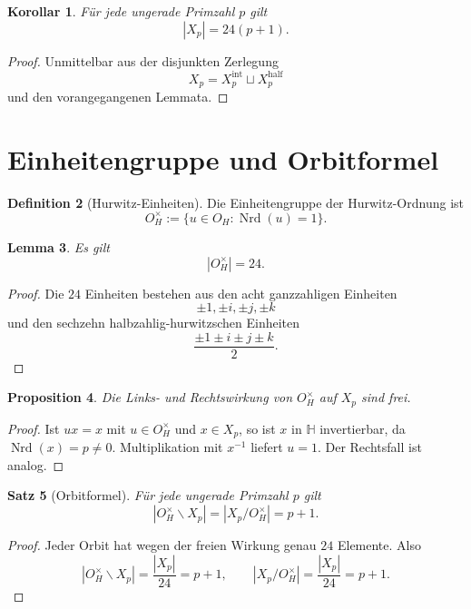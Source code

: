 \documentclass[a4paper,12pt]{article}
\newtheorem{satz}{Satz}[section]
\newtheorem{lemma}[satz]{Lemma}
\newtheorem{proposition}[satz]{Proposition}
\newtheorem{korollar}[satz]{Korollar}
\theoremstyle{definition}
\newtheorem{definition}[satz]{Definition}
\numberwithin{equation}{section}
\newcommand{\OH}{O_H}
\newcommand{\HH}{\mathbb{H}}
\newcommand{\Nrd}{\operatorname{Nrd}}
\begin{document}
	\begin{korollar}
		Für jede ungerade Primzahl \(p\) gilt
		\[
		|X_p|=24(p+1).
		\]
	\end{korollar}
	
	\begin{proof}
		Unmittelbar aus der disjunkten Zerlegung
		\[
		X_p=X_p^{\mathrm{int}}\sqcup X_p^{\mathrm{half}}
		\]
		und den vorangegangenen Lemmata.
	\end{proof}
	
	\section{Einheitengruppe und Orbitformel}
	
	\begin{definition}[Hurwitz-Einheiten]
		Die Einheitengruppe der Hurwitz-Ordnung ist
		\[
		\OH^\times:=\{u\in \OH:\Nrd(u)=1\}.
		\]
	\end{definition}
	
	\begin{lemma}
		Es gilt
		\[
		|\OH^\times|=24.
		\]
	\end{lemma}
	
	\begin{proof}
		Die \(24\) Einheiten bestehen aus den acht ganzzahligen Einheiten
		\[
		\pm1,\pm i,\pm j,\pm k
		\]
		und den sechzehn halbzahlig-hurwitzschen Einheiten
		\[
		\frac{\pm1\pm i\pm j\pm k}{2}.
		\]
	\end{proof}
	
	\begin{proposition}
		Die Links- und Rechtswirkung von \(\OH^\times\) auf \(X_p\) sind frei.
	\end{proposition}
	
	\begin{proof}
		Ist \(ux=x\) mit \(u\in \OH^\times\) und \(x\in X_p\), so ist \(x\) in \(\HH\) invertierbar, da \(\Nrd(x)=p\neq 0\). Multiplikation mit \(x^{-1}\) liefert \(u=1\). Der Rechtsfall ist analog.
	\end{proof}
	
	\begin{satz}[Orbitformel]
		Für jede ungerade Primzahl \(p\) gilt
		\[
		|\OH^\times\backslash X_p|
		=
		|X_p/\OH^\times|
		=
		p+1.
		\]
	\end{satz}
	
	\begin{proof}
		Jeder Orbit hat wegen der freien Wirkung genau \(24\) Elemente. Also
		\[
		|\OH^\times\backslash X_p|=\frac{|X_p|}{24}=p+1,
		\qquad
		|X_p/\OH^\times|=\frac{|X_p|}{24}=p+1.
		\]
	\end{proof}
	
\end{document}
